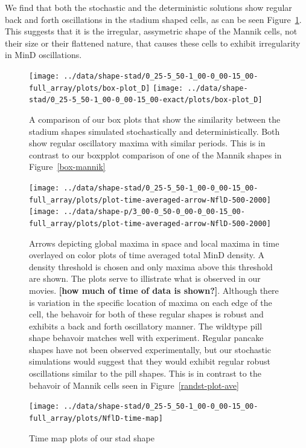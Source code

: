 \documentclass[letterpaper,twocolumn,amsmath,amssymb,pre]{revtex4-1}
\newcommand{\red}[1]{{\bf \color{red} #1}}
\newcommand{\fixme}[1]{\red{[#1]}}
\begin{document}
We find that both the stochastic and the deterministic solutions show
regular back and forth oscillations in the stadium shaped cells, as
can be seen Figure~\ref{box-stadium}.  This suggests that it is the
irregular, assymetric shape of the Mannik cells, not their size or
their flattened nature, that causes these cells to exhibit
irregularity in MinD oscillations.

\begin{figure}
  \texttt{[image: ../data/shape-stad/0\_25-5\_50-1\_00-0\_00-15\_00-full\_array/plots/box-plot\_D]}
  \texttt{[image: ../data/shape-stad/0\_25-5\_50-1\_00-0\_00-15\_00-exact/plots/box-plot\_D]}
  \caption{A comparison of our box plots that show the similarity
    between the stadium shapes simulated stochastically and
    deterministically.  Both show regular oscillatory maxima with
    similar periods.  This is in contrast to our boxpplot comparison
    of one of the Mannik shapes in Figure~\ref{box-mannik}}
  \label{box-stadium}
\end{figure}


\begin{figure}
  \texttt{[image: ../data/shape-stad/0\_25-5\_50-1\_00-0\_00-15\_00-full\_array/plots/plot-time-averaged-arrow-NflD-500-2000]}
  \texttt{[image: ../data/shape-p/3\_00-0\_50-0\_00-0\_00-15\_00-full\_array/plots/plot-time-averaged-arrow-NflD-500-2000]}
  \caption{Arrows depicting global maxima in space and local maxima in
    time overlayed on color plots of time averaged total MinD
    density. A density threshold is chosen and only maxima above this
    threshold are shown. The plots serve to illistrate what is
    observed in our movies. \fixme{how much of time of data is
      shown?}.  Although there is variation in the specific location
    of maxima on each edge of the cell, the behavoir for both of these
    regular shapes is robust and exhibits a back and forth oscillatory
    manner.  The wildtype pill shape behavoir matches well with
    experiment.  Regular pancake shapes have not been observed
    experimentally, but our stochastic simulations would suggest that
    they would exhibit regular robust oscillations similar to the pill
    shapes.  This is in contrast to the behavoir of Mannik cells seen
    in Figure~\ref{randst-plot-ave}}
  \label{arrow-pill-stadium}
\end{figure}

\begin{figure}
  \texttt{[image: ../data/shape-stad/0\_25-5\_50-1\_00-0\_00-15\_00-full\_array/plots/NflD-time-map]}
  \caption{Time map plots of our stad shape}
  \label{time-maps-stad}
\end{figure}
\end{document}

